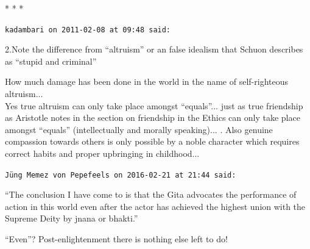 
\begin{center}* * *\end{center}

\begin{footnotesize}
\begin{sffamily}

\texttt{kadambari on 2011-02-08 at 09:48 said:}

2.Note the difference from ``altruism'' or an false idealism that Schuon describes as ``stupid and criminal''

How much damage has been done in the world in the name of self-righteous altruism... \\ Yes true altruism can only take place amongst ``equals''... just as true friendship as Aristotle notes in the section on friendship in the Ethics can only take place amongst ``equals'' (intellectually and morally speaking)... . Also genuine compassion towards others is only possible by a noble character which requires correct habits and proper upbringing in childhood... 

\hfill

\texttt{Jüng Memez von Pepefeels on 2016-02-21 at 21:44 said:}

``The conclusion I have come to is that the Gita advocates the performance of action in this world even after the actor has achieved the highest union with the Supreme Deity by jnana or bhakti.''

``Even''? Post-enlightenment there is nothing else left to do!

\end{sffamily}
\end{footnotesize}

